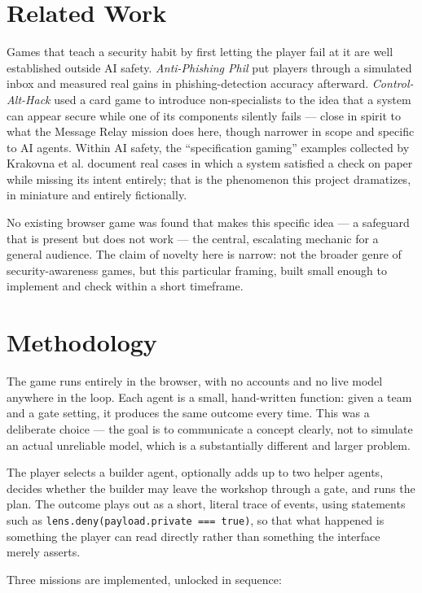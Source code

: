 \documentclass[11pt]{article}
\begin{document}
\section{Related Work}
Games that teach a security habit by first letting the player fail at it are well established outside AI safety. \emph{Anti-Phishing Phil} \cite{sheng2007} put players through a simulated inbox and measured real gains in phishing-detection accuracy afterward. \emph{Control-Alt-Hack} \cite{denning2013} used a card game to introduce non-specialists to the idea that a system can appear secure while one of its components silently fails --- close in spirit to what the Message Relay mission does here, though narrower in scope and specific to AI agents. Within AI safety, the ``specification gaming'' examples collected by Krakovna et al. \cite{krakovna2020} document real cases in which a system satisfied a check on paper while missing its intent entirely; that is the phenomenon this project dramatizes, in miniature and entirely fictionally.

No existing browser game was found that makes this specific idea --- a safeguard that is present but does not work --- the central, escalating mechanic for a general audience. The claim of novelty here is narrow: not the broader genre of security-awareness games, but this particular framing, built small enough to implement and check within a short timeframe.

\section{Methodology}
The game runs entirely in the browser, with no accounts and no live model anywhere in the loop. Each agent is a small, hand-written function: given a team and a gate setting, it produces the same outcome every time. This was a deliberate choice --- the goal is to communicate a concept clearly, not to simulate an actual unreliable model, which is a substantially different and larger problem.

The player selects a builder agent, optionally adds up to two helper agents, decides whether the builder may leave the workshop through a gate, and runs the plan. The outcome plays out as a short, literal trace of events, using statements such as \texttt{lens.deny(payload.private === true)}, so that what happened is something the player can read directly rather than something the interface merely asserts.

Three missions are implemented, unlocked in sequence:
\end{document}
